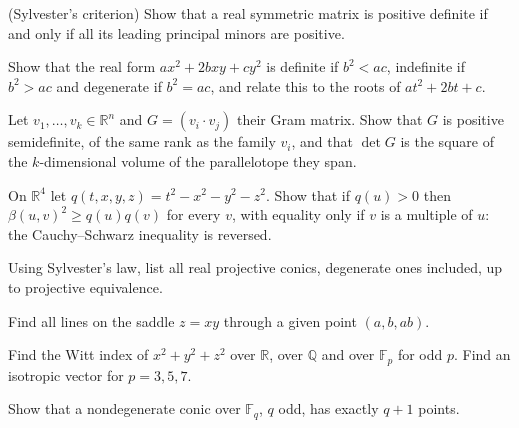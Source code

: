 \begin{exercise}[$\star\star$]\label{ex:sylvestercrit}
(Sylvester's criterion) Show that a real symmetric matrix is positive definite if and only if all its leading principal minors are positive.
\end{exercise}

\begin{exercise}[$\star$]\label{ex:binarydisc}
Show that the real form $ax^2+2bxy+cy^2$ is definite if $b^2<ac$, indefinite if $b^2>ac$ and degenerate if $b^2=ac$, and relate this to the roots
of $at^2+2bt+c$.
\end{exercise}

\begin{exercise}[$\star$]\label{ex:gram}
Let $v_1,\dots,v_k\in\mathbb R^n$ and $G=(v_i\cdot v_j)$ their Gram matrix. Show that $G$ is positive semidefinite, of the same rank as the family $v_i$, and
that $\det G$ is the square of the $k$-dimensional volume of the parallelotope they span.
\end{exercise}

\begin{exercise}[$\star\star$]\label{ex:lorentz}
On $\mathbb R^4$ let $q(t,x,y,z)=t^2-x^2-y^2-z^2$. Show that if $q(u)>0$ then $\beta(u,v)^2\ge q(u)q(v)$ for every $v$, with equality only if $v$ is a
multiple of $u$: the Cauchy--Schwarz inequality is reversed.
\end{exercise}

\begin{exercise}[$\star$]\label{ex:conicsclass}
Using Sylvester's law, list all real projective conics, degenerate ones included, up to projective equivalence.
\end{exercise}

\begin{exercise}[$\star$]\label{ex:saddlelines}
Find all lines on the saddle $z=xy$ through a given point $(a,b,ab)$.
\end{exercise}

\begin{exercise}[$\star$]\label{ex:wittFp}
Find the Witt index of $x^2+y^2+z^2$ over $\mathbb R$, over $\mathbb Q$ and over $\mathbb F_p$ for odd $p$. Find an isotropic vector for $p=3,5,7$.
\end{exercise}

\begin{exercise}[$\star$]\label{ex:conicFq}
Show that a nondegenerate conic over $\mathbb F_q$, $q$ odd, has exactly $q+1$ points.
\end{exercise}

